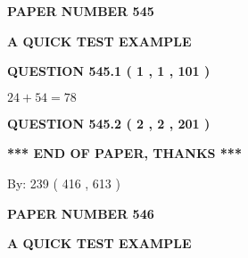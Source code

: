 \documentclass[12pt]{article}
\begin{document}
   
 {\textbf{ \Large{ PAPER NUMBER  545  }}}
   
   
\vspace{0.2in}
   
   
   
   
   
   
 \vspace{0.2in}
{\LARGE {\textbf{ A QUICK TEST EXAMPLE}}}
   
   
  
\vspace{0.2in}
  
{\textbf{\Large{QUESTION
545.1 
 ( 1 , 1 , 101 )
}}}
  
  
 
 

$ %
24 +  %
54=   %
78$
 
 
  
\vspace{0.2in}
  
{\textbf{\Large{QUESTION
545.2 
 ( 2 , 2 , 201 )
}}}
  
  
   
   
 \vspace{0.2in}
 
   
   
   
   
\vspace{1.0in} 
{\textbf{\large{ *** END OF PAPER, THANKS *** }}} 
   
   
\hspace{1.0in} By: 
 239 ( 416 ,  613 )
   
   
   
   
\newpage 
\setcounter{page}{ 
   546001 } 
   
   
   
   
 {\textbf{ \Large{ PAPER NUMBER  546  }}}
   
   
\vspace{0.2in}
   
   
   
   
   
   
 \vspace{0.2in}
{\LARGE {\textbf{ A QUICK TEST EXAMPLE}}}
   
   
  
\vspace{0.2in}
  
\end{document}
